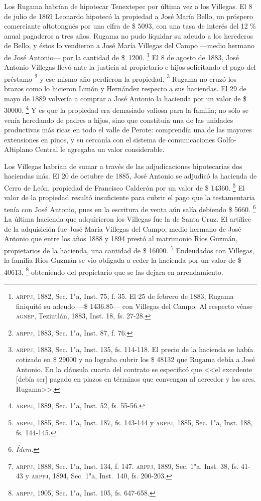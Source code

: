 \documentclass[14pt,twoside,final]{extbook} %
\let\oldfootnote\footnote
\renewcommand\footnote[1]{%
\oldfootnote{\hspace{1mm}#1}}
\begin{document}
Los Rugama habrían de hipotecar Tenextepec por última vez a los Villegas. El 8 de julio de 1869 Leonardo hipotecó la propiedad a José María Bello, un próspero comerciante altotongués por una cifra de \$ 5093, con una tasa de interés del 12 \% anual pagaderos a tres años. Rugama no pudo liquidar su adeudo a los herederos de Bello, y éstos lo vendieron a José María Villegas del Campo ---medio hermano de José Antonio--- por la cantidad de \$~1200.\footnote{\textsc{arppj}, 1882, Sec. 1"a, Inst. 75, f. 35. El 25 de febrero de 1883, Rugama finiquitó su adeudo ---\$ 1436.85--- con Villegas del Campo. Al respecto véase \textsc{agnep}, Teziutlán, 1883, Inst. 18, fs. 27-28.} El 8 de agosto de 1883, José Antonio Villegas llevó ante la justicia al propietario e hijos solicitando el pago del préstamo\footnote{\textsc{arppj}, 1883, Sec. 1"a, Inst. 87, f. 76.} y ese mismo año perdieron la propiedad.\footnote{\textsc{arppj}, 1883, Sec. 1"a, Inst. 135, fs. 114-118. El precio de la hacienda se había cotizado en \$ 29000 y no lograba cubrir los \$ 48132 que Rugama debía a José Antonio. En la cláusula cuarta del contrato se especificó que <<el excedente [debía ser] pagado en plazos en términos que convengan al acreedor y los sres. Rugama>>.} Rugama no cruzó los brazos como lo hicieron
Limón y Hernández respecto a sus haciendas. El 29 de mayo de 1889 volvería a comprar a José Antonio la hacienda por un valor de \$ 30000.\footnote{\textsc{arppj}, 1889, Sec. 1"a, Inst. 52, fs. 55-56.} Y es que la propiedad era demasiado valiosa para la familia; no sólo se venía heredando de padres a hijos, sino que constituía una de las unidades productivas más ricas en todo el valle de Perote: comprendía una de las mayores extensiones en pinos, y su cercanía con el sistema de comunicaciones Golfo-Altiplano Central le agregaba un valor considerable.

Los Villegas habrían de sumar a través de las adjudicaciones hipotecarias dos haciendas más. El 20 de octubre de 1885, José Antonio se adjudicó la hacienda de Cerro de León, propiedad de Francisco Calderón por un valor de \$ 14360.\footnote{\textsc{arppj}, 1885, Sec. 1"a, Inst. 187, fs. 143-144 y \textsc{arppj}, 1885, Sec. 1"a, Inst. 188, fs. 144-145.} El valor de la propiedad resultó insuficiente para cubrir el pago que la testamentaria tenía con José Antonio, pues en la escritura de venta aún salía debiendo \$ 5660.\footnote{\em Ídem.} La última hacienda que adquirieron los Villegas fue la de Santa Cruz. El artífice de la adquisición fue José María Villegas del Campo, medio hermano de José Antonio que entre los años 1888 y 1894 prestó al matrimonio Ríos Guzmán, propietarios de la hacienda, una cantidad de \$ 16000.\footnote{\textsc{arppj}, 1888, Sec. 1"a, Inst. 134, f. 147. \textsc{arppj}, 1889, Sec. 1"a, Inst. 38, fs. 41-43 y \textsc{arppj}, 1894, Sec. 1"a, Inst.~140, fs. 200-203.} Endeudados con Villegas, la familia Ríos Guzmán se vio obligada a ceder la hacienda por un valor de \$ 40613,\footnote{\textsc{arppj}, 1905, Sec. 1"a, Inst. 105, fs. 647-658.} obteniendo del propietario que se las dejara en arrendamiento.
\end{document}
